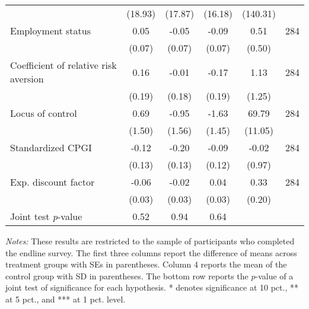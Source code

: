 \begin{table}[h]
{\begin{threeparttable}
\begin{tabular}{l*{5}{c}}
          &  (18.93)&  (17.87)&  (16.18)& (140.31)&         \\
Employment status&     0.05&    -0.05&    -0.09&     0.51&      284\\
          &   (0.07)&   (0.07)&   (0.07)&   (0.50)&         \\
Coefficient of relative risk aversion&     0.16&    -0.01&    -0.17&     1.13&      284\\
          &   (0.19)&   (0.18)&   (0.19)&   (1.25)&         \\
Locus of control&     0.69&    -0.95&    -1.63&    69.79&      284\\
          &   (1.50)&   (1.56)&   (1.45)&  (11.05)&         \\
Standardized CPGI&    -0.12&    -0.20&    -0.09&    -0.02&      284\\
          &   (0.13)&   (0.13)&   (0.12)&   (0.97)&         \\
Exp. discount factor&-0.06\sym{**}&    -0.02&     0.04&     0.33&      284\\
          &   (0.03)&   (0.03)&   (0.03)&   (0.20)&         \\
\midrule Joint test \emph{p}-value&     0.52&     0.94&     0.64&         &         \\
\bottomrule \end{tabular} \begin{tablenotes}[flushleft] \footnotesize \item \emph{Notes:} These results are restricted to the sample of participants who completed the endline survey. The first three columns report the difference of means across treatment groups with SEs in parentheses. Column 4 reports the mean of the control group with SD in parentheses. The bottom row reports the \(p\)-value of a joint test of significance for each hypothesis. * denotes significance at 10 pct., ** at 5 pct., and *** at 1 pct. level. \end{tablenotes} \end{threeparttable} } \end{table}


